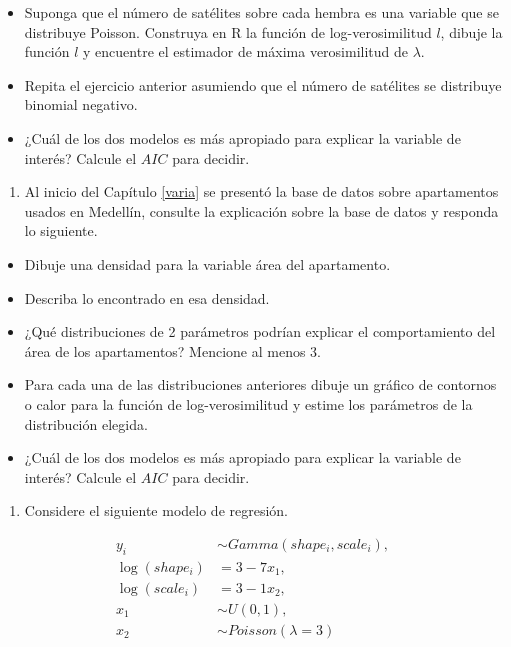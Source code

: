 \documentclass[10pt,]{krantz}
\providecommand{\tightlist}{%
  \setlength{\itemsep}{0pt}\setlength{\parskip}{0pt}}
\let\proglang=\textsf
\begin{document}
\begin{itemize}
\tightlist
\item
  Suponga que el número de satélites sobre cada hembra es una variable
  que se distribuye Poisson. Construya en \proglang{R} la función de
  log-verosimilitud \(l\), dibuje la función \(l\) y encuentre el
  estimador de máxima verosimilitud de \(\lambda\).
\item
  Repita el ejercicio anterior asumiendo que el número de satélites se
  distribuye binomial negativo.
\item
  ¿Cuál de los dos modelos es más apropiado para explicar la variable de
  interés? Calcule el \(AIC\) para decidir.
\end{itemize}

\begin{enumerate}
\def\labelenumi{\arabic{enumi})}
\setcounter{enumi}{2}
\tightlist
\item
  Al inicio del Capítulo \ref{varia} se presentó la base de datos sobre
  apartamentos usados en Medellín, consulte la explicación sobre la base
  de datos y responda lo siguiente.
\end{enumerate}

\begin{itemize}
\tightlist
\item
  Dibuje una densidad para la variable área del apartamento.
\item
  Describa lo encontrado en esa densidad.
\item
  ¿Qué distribuciones de 2 parámetros podrían explicar el comportamiento
  del área de los apartamentos? Mencione al menos 3.
\item
  Para cada una de las distribuciones anteriores dibuje un gráfico de
  contornos o calor para la función de log-verosimilitud y estime los
  parámetros de la distribución elegida.
\item
  ¿Cuál de los dos modelos es más apropiado para explicar la variable de
  interés? Calcule el \(AIC\) para decidir.
\end{itemize}

\begin{enumerate}
\def\labelenumi{\arabic{enumi})}
\setcounter{enumi}{3}
\tightlist
\item
  Considere el siguiente modelo de regresión.
\end{enumerate}

\begin{align*}
y_i &\sim Gamma(shape_i, scale_i), \\
\log(shape_i) &= 3 - 7 x_1, \\
\log(scale_i) &= 3 - 1 x_2, \\
x_1 &\sim U(0, 1), \\
x_2 &\sim Poisson(\lambda=3)
\end{align*}
\end{document}
